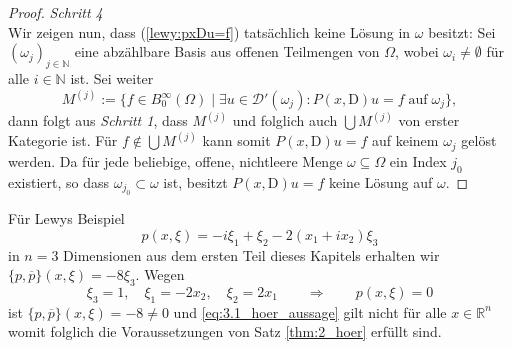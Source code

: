 \begin{proof}
\textit{Schritt 4}\\
Wir zeigen nun, dass (\ref{lewy:pxDu=f}) tatsächlich keine Lösung in $\omega$ besitzt: Sei $(\omega_j)_{j\in\mathbb{N}}$ eine abzählbare Basis aus offenen Teilmengen von $\Omega$, wobei $\omega_i\neq\emptyset$ für alle $i\in\mathbb{N}$ ist. Sei weiter
\begin{equation}
M^{(j)}:=\{f\in B_0^\infty(\Omega)\mid \exists u\in\mathscr{D}'(\omega_j): P(x,\mathrm{D})u=f\;\mathrm{auf\;}\omega_j\},
\end{equation}
dann folgt aus \textit{Schritt 1}, dass $M^{(j)}$ und folglich auch $\bigcup M^{(j)}$ von erster Kategorie ist. Für $f\notin \bigcup M^{(j)}$ kann somit $P(x,\mathrm{D})u=f$ auf keinem $\omega_j$ gelöst werden. Da für jede beliebige, offene, nichtleere Menge $\omega\subseteq\Omega$ ein Index $j_0$ existiert, so dass $\omega_{j_0}\subset\omega$ ist, besitzt $P(x,\mathrm{D})u=f$ keine Lösung auf $\omega$.
\end{proof}

\begin{exa}
Für Lewys Beispiel 
\begin{equation}
p(x,\xi)=-i\xi_1+\xi_2-2(x_1+ix_2)\xi_3
\end{equation}
in $n=3$ Dimensionen aus dem ersten Teil dieses Kapitels erhalten wir $\{p,\overline{p}\}(x,\xi)=-8\xi_3$. Wegen
\begin{equation}
\xi_3 =1,\quad \xi_1=-2x_2,\quad \xi_2=2x_1\qquad\Rightarrow\qquad p(x,\xi)=0
\end{equation}
ist $\{p,\overline{p}\}(x,\xi)=-8\neq 0$ und \eqref{eq:3.1_hoer_aussage} gilt nicht für alle $x\in\mathbb{R}^n$ womit folglich die Voraussetzungen von Satz \ref{thm:2_hoer} erfüllt sind.
\end{exa}